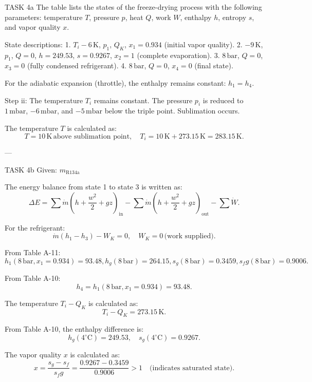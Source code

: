 TASK 4a  
The table lists the states of the freeze-drying process with the following parameters: temperature \( T \), pressure \( p \), heat \( Q \), work \( W \), enthalpy \( h \), entropy \( s \), and vapor quality \( x \).  

State descriptions:  
1. \( T_i - 6 \, \text{K} \), \( p_1 \), \( Q_K \), \( x_1 = 0.934 \) (initial vapor quality).  
2. \( -9 \, \text{K} \), \( p_1 \), \( Q = 0 \), \( h = 249.53 \), \( s = 0.9267 \), \( x_2 = 1 \) (complete evaporation).  
3. \( 8 \, \text{bar} \), \( Q = 0 \), \( x_3 = 0 \) (fully condensed refrigerant).  
4. \( 8 \, \text{bar} \), \( Q = 0 \), \( x_4 = 0 \) (final state).  

For the adiabatic expansion (throttle), the enthalpy remains constant: \( h_1 = h_4 \).  

Step ii:  
The temperature \( T_i \) remains constant. The pressure \( p_i \) is reduced to \( 1 \, \text{mbar} \), \( -6 \, \text{mbar} \), and \( -5 \, \text{mbar} \) below the triple point. Sublimation occurs.  

The temperature \( T \) is calculated as:  
\[
T = 10 \, \text{K} \, \text{above sublimation point}, \quad T_i = 10 \, \text{K} + 273.15 \, \text{K} = 283.15 \, \text{K}.
\]

---

TASK 4b  
Given: \( m_{\text{R134a}} \)  

The energy balance from state 1 to state 3 is written as:  
\[
\Delta E = \sum \dot{m} \left( h + \frac{w^2}{2} + gz \right)_{\text{in}} - \sum \dot{m} \left( h + \frac{w^2}{2} + gz \right)_{\text{out}} - \sum \dot{W}.
\]  

For the refrigerant:  
\[
\dot{m} \left( h_1 - h_3 \right) - W_K = 0, \quad W_K = 0 \, \text{(work supplied)}.
\]  

From Table A-11:  
\[
h_1 (8 \, \text{bar}, x_1 = 0.934) = 93.48,  
h_g (8 \, \text{bar}) = 264.15,  
s_g (8 \, \text{bar}) = 0.3459,  
s_fg (8 \, \text{bar}) = 0.9006.
\]  

From Table A-10:  
\[
h_4 = h_1 (8 \, \text{bar}, x_1 = 0.934) = 93.48.
\]  

The temperature \( T_i - Q_K \) is calculated as:  
\[
T_i - Q_K = 273.15 \, \text{K}.
\]  

From Table A-10, the enthalpy difference is:  
\[
h_g (4^\circ \text{C}) = 249.53, \quad s_g (4^\circ \text{C}) = 0.9267.
\]  

The vapor quality \( x \) is calculated as:  
\[
x = \frac{s_g - s_f}{s_fg} = \frac{0.9267 - 0.3459}{0.9006} > 1 \quad \text{(indicates saturated state)}.
\]